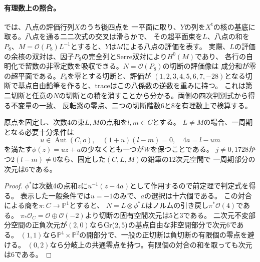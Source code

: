 \paragraph{有理数上の照合。}
では、八点の評価行列$X$のうち後四点を
一平面に取り、$Y$の列を$X^{\mathsf t}$の核の基底に取る。八点を通る二二次式の交叉は滑らかで、
その超平面束を$L$、八点の和を$P_8$、$M=\mathcal O(P_8)L^{-1}$とすると、$Y$は$M$による八点の評価を表す。
実際、$L$の評価の余核の双対は、因子$P_8$の完全列とSerre双対により$H^0(M)$であり、
各行の自明化で留数の非零定数を吸収できる。$N=\mathcal O(P_8)$の切断の評価像は
成分和が零の超平面である。$P_8$を零とする切断と、評価が
$(1,2,3,4,5,6,7,-28)$となる切断で基点自由鉛筆を作ると、traceはこの八係数の逆数を重みに持つ。
これは第二切断と任意の$N$の切断との積を消すことから分かる。両側の四次判別式から得る不変量の一致、
反転窓の零点、二つの切断階数6と8を有理数上で検算する。

\begin{corollary}[周期の判定と一般の直線束に対する一周期層]\label{cor:elliptic-pencil-period}
原点を固定し、次数4の束$L,M$の点和を$l,m\in C$とする。
$L\ne M$の場合、一周期となる必要十分条件は
\[
 u\in\operatorname{Aut}(C,o),\quad (1+u)(l-m)=0,\quad 4a=l-u m
\]
を満たす$\phi(z)=uz+a$の少なくとも一つが$W$を保つことである。
$j\ne0,1728$かつ$2(l-m)\ne0$なら、固定した$(C,L,M)$の鉛筆の12次元空間で
一周期部分の次元は6である。
\end{corollary}
\begin{proof}
$\phi^*$は次数4の点和$z$に$u^{-1}(z-4a)$として作用するので前定理で判定式を得る。
表示した一般条件では$u=-1$のみで、$a$の選択は十六個である。
この対合による商を$\pi:C\to\mathbb P^1$とすると、
$N=L\otimes\phi^*L$はノルムの引き戻し$\pi^*\mathcal O(4)$である。
$\pi_*\mathcal O_C=\mathcal O\oplus\mathcal O(-2)$より切断の固有空間次元は5と3である。
二次元不変部分空間の正負次元が$(2,0)$なら$\operatorname{Gr}(2,5)$の基点自由な非空開部分で次元6である。
$(1,1)$なら$\mathbb P^4\times\mathbb P^2$の開部分で、一般の正切断は負切断の有限個の零点を避ける。
$(0,2)$なら分岐上の共通零点を持つ。有限個の対合の和を取っても次元は6である。
\end{proof}

